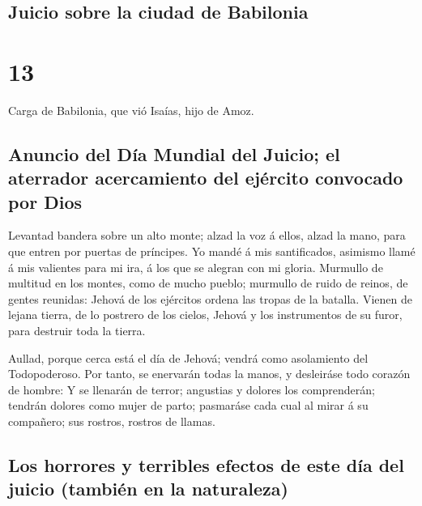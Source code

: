 \hypertarget{juicio-sobre-la-ciudad-de-babilonia}{%
\subsection{Juicio sobre la ciudad de
Babilonia}\label{juicio-sobre-la-ciudad-de-babilonia}}

\hypertarget{section-12}{%
\section{13}\label{section-12}}

 Carga de Babilonia, que vió Isaías, hijo de Amoz.

\hypertarget{anuncio-del-duxeda-mundial-del-juicio-el-aterrador-acercamiento-del-ejuxe9rcito-convocado-por-dios}{%
\subsection{Anuncio del Día Mundial del Juicio; el aterrador
acercamiento del ejército convocado por
Dios}\label{anuncio-del-duxeda-mundial-del-juicio-el-aterrador-acercamiento-del-ejuxe9rcito-convocado-por-dios}}

 Levantad bandera sobre un alto monte; alzad la voz á
ellos, alzad la mano, para que entren por puertas de príncipes.
 Yo mandé á mis santificados, asimismo llamé á mis
valientes para mi ira, á los que se alegran con mi gloria.
 Murmullo de multitud en los montes, como de mucho pueblo;
murmullo de ruido de reinos, de gentes reunidas: Jehová de los ejércitos
ordena las tropas de la batalla.  Vienen de lejana tierra,
de lo postrero de los cielos, Jehová y los instrumentos de su furor,
para destruir toda la tierra.

 Aullad, porque cerca está el día de Jehová; vendrá como
asolamiento del Todopoderoso.  Por tanto, se enervarán
todas la manos, y desleiráse todo corazón de hombre:  Y se
llenarán de terror; angustias y dolores los comprenderán; tendrán
dolores como mujer de parto; pasmaráse cada cual al mirar á su
compañero; sus rostros, rostros de llamas.

\hypertarget{los-horrores-y-terribles-efectos-de-este-duxeda-del-juicio-tambiuxe9n-en-la-naturaleza}{%
\subsection{Los horrores y terribles efectos de este día del juicio
(también en la
naturaleza)}\label{los-horrores-y-terribles-efectos-de-este-duxeda-del-juicio-tambiuxe9n-en-la-naturaleza}}

